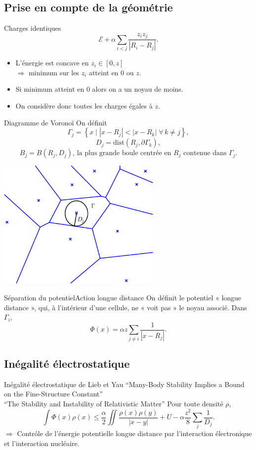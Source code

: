 \documentclass{beamer}
\renewcommand{\leq}{\leqslant}
\begin{document}
\subsection{Prise en compte de la géométrie}
\begin{frame}{Charges identiques}
            \[\mathcal{E} + \alpha\sum_{i < j} \frac{z_i z_j}{|R_i-R_j|}.\]
    \begin{itemize}
        \item L'énergie est concave en $z_i \in [0, z]$\\
            $\Rightarrow$ minimum sur les $z_i$ atteint en $0$ ou $z$.
        \item Si minimum atteint en $0$ alors on a un noyau de moins.
        \item On considère donc toutes les charges égales à $z$.
    \end{itemize}
\end{frame}
\begin{frame}{Diagramme de Voronoï}
    On définit
              \[\Gamma_j = \left\{x \; \big| \; |x-R_j| < |x-R_k|\; \forall\, k\neq j\right\},\]
              \[D_j = \text{dist}(R_j, \mathit{\partial}\Gamma_k),\]
              \[B_j = {B(R_j, D_j)}\text{, la plus grande boule centrée en $R_j$ contenue
              dans }\Gamma_j.\]
    \begin{center}
    \includegraphics[width=0.6\textwidth]{voronoi.pdf}
    \end{center}
\end{frame}
\begin{frame}{Séparation du potentiel}{Action longue distance}
    On définit le potentiel « longue distance », qui, à l'intérieur d'une cellule, ne « voit pas
    » le noyau associé. Dans $\Gamma_i$,
    \[\Phi(x) = \alpha z \sum_{j\neq i} \frac{1}{|x-R_j|}.\]
\end{frame}
\subsection{Inégalité électrostatique}
\begin{frame}{Inégalité électrostatique de Lieb et Yau}
    {``Many-Body Stability Implies a Bound on the Fine-Structure Constant''\\
    ``The Stability and Instability of Relativistic Matter''}
    Pour toute densité $\rho$,
    \[\int\Phi(x)\rho(x) \leq \frac{\alpha}{2}\iint
    \frac{\rho(x)\rho(y)}{|x-y|} + U - 
    \alpha \frac{z^2}{8}\sum_j \frac{1}{D_j}.\]
    $\Rightarrow$ Contrôle de l'énergie potentielle longue distance
    par l'interaction électronique et l'interaction nucléaire.
\end{frame}
\end{document}
